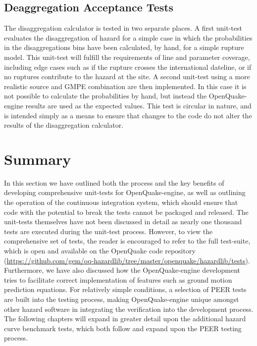 \subsection{Deaggregation Acceptance Tests}
The disaggregation calculator is tested in two separate places.  A first
unit-test evaluates the disaggregation of hazard for a simple case in which the
probabilities in the disaggregations bins have been calculated, by hand, for a
simple rupture model. 
%
This unit-test will fulfill the requirements of line and parameter coverage,
including edge cases such as if the rupture crosses the international dateline,
or if no ruptures contribute to the hazard at the site. A second unit-test using
a more realistic source and GMPE combination are then implemented. In this case
it is not possible to calculate the probabilities by hand, but instead the
OpenQuake-engine results are used as the expected values. 
%
This test is circular in nature, and is intended simply as a means 
to ensure that changes to the code do not alter the results of the 
disaggregation calculator.

%
\section{Summary}
In this section we have outlined both the process and the key benefits 
of developing comprehensive unit-tests for OpenQuake-engine, as well as 
outlining the operation of the continuous integration system, which
should ensure that code with the potential to break the tests cannot
be packaged and released. The unit-tests themselves have not been 
discussed in detail as nearly one thousand tests are executed during 
the unit-test process. However, to view the comprehensive set of tests,
the reader is encouraged to refer to the full test-suite, which is open 
and available on the OpenQuake code repository 
(\href{https://github.com/gem/oq-hazardlib/tree/master/openquake/hazardlib/tests}{https://github.com/gem/oq-hazardlib/tree/master/openquake/hazardlib/tests}). 
%
Furthermore, we have also discussed how the OpenQuake-engine development tries
to facilitate correct implementation of features such as ground motion
prediction equations. For relatively simple conditions, a selection of PEER
tests \citep{thomas2010} are built into the testing process, making
OpenQuake-engine unique amongst other hazard software in integrating the
verification into the development process. 
%
The following chapters will expand in greater detail upon the additional
hazard curve benchmark tests, which both follow and expand upon the 
PEER testing process.
